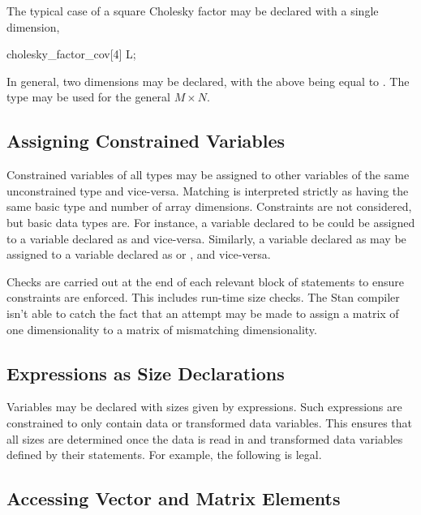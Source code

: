 The typical case of a square Cholesky factor may be declared with a
single dimension,
%
\begin{stancode}
cholesky_factor_cov[4] L;
\end{stancode}
%
In general, two dimensions may be declared, with the above being equal to
.  The
type  may be used for the general
$M \times N$.

\subsection{Assigning Constrained Variables}

Constrained variables of all types may be assigned to other variables
of the same unconstrained type and vice-versa.  Matching is interpreted strictly
as having the same basic type and number of array dimensions.
Constraints are not considered, but basic data types are. For instance, a
variable declared to be  could be assigned
to a variable declared as  and vice-versa.  Similarly, a
variable declared as  may be assigned to a variable
declared as  or
, and vice-versa.

Checks are carried out at the end of each relevant block of statements
to ensure constraints are enforced.  This includes run-time size
checks.  The Stan compiler isn't able to catch the fact that an
attempt may be made to assign a matrix of one dimensionality to a
matrix of mismatching dimensionality.


\subsection{Expressions as Size Declarations}

Variables may be declared with sizes given by expressions.  Such
expressions are constrained to only contain data or transformed data
variables.  This ensures that all sizes are determined once the data
is read in and transformed data variables defined by their statements.
For example, the following is legal.
%
\begin{stancode}
data {
  int<lower=0> N_observed;    int<lower=0> N_missing;
  // ...
transformed parameters {
  vector[N_observed + N_missing] y;
  // ...
\end{stancode}

\subsection{Accessing Vector and Matrix Elements}

